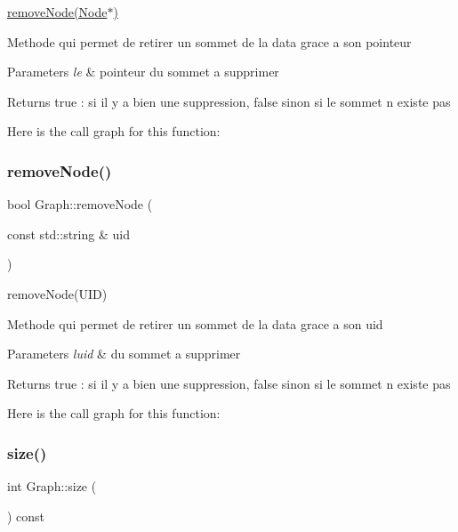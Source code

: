 \mbox{\hyperlink{class_graph_a32b254ea9535f8f4ad831d129db525e8}{remove\+Node(\+Node$\ast$)}} 

Methode qui permet de retirer un sommet de la data grace a son pointeur


\begin{DoxyParams}{Parameters}
{\em le} & pointeur du sommet a supprimer\\
\hline
\end{DoxyParams}
\begin{DoxyReturn}{Returns}
true \+: si il y a bien une suppression, false sinon si le sommet n existe pas 
\end{DoxyReturn}
Here is the call graph for this function\+:
\mbox{\label{class_graph_a1c30c580ccc957167dc64ca1a9e19248}} 
\subsubsection{\texorpdfstring{remove\+Node()}{removeNode()}\hspace{0.1cm}{\footnotesize\ttfamily [2/2]}}
{\footnotesize\ttfamily bool Graph\+::remove\+Node (\begin{DoxyParamCaption}\item[{const std\+::string \&}]{uid }\end{DoxyParamCaption})}



remove\+Node(\+U\+I\+D) 

Methode qui permet de retirer un sommet de la data grace a son uid


\begin{DoxyParams}{Parameters}
{\em l\textquotesingle{}uid} & du sommet a supprimer\\
\hline
\end{DoxyParams}
\begin{DoxyReturn}{Returns}
true \+: si il y a bien une suppression, false sinon si le sommet n existe pas 
\end{DoxyReturn}
Here is the call graph for this function\+:
\mbox{\label{class_graph_a6539d03f6d3f42042196f0f79455bdd8}} 
\subsubsection{\texorpdfstring{size()}{size()}}
{\footnotesize\ttfamily int Graph\+::size (\begin{DoxyParamCaption}{ }\end{DoxyParamCaption}) const}



